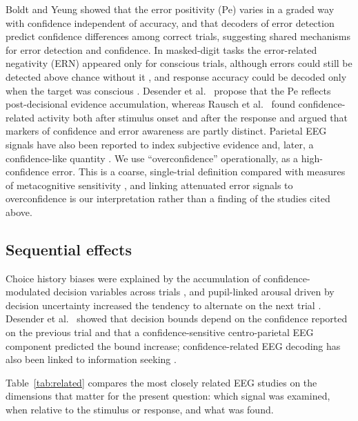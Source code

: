 \documentclass[11pt,a4paper]{article}
\begin{document}
Boldt and Yeung \cite{r3} showed that the error positivity (Pe) varies in a graded way with confidence independent of accuracy, and that decoders of error detection predict confidence differences among correct trials, suggesting shared mechanisms for error detection and confidence. In masked-digit tasks the error-related negativity (ERN) appeared only for conscious trials, although errors could still be detected above chance without it \cite{r16}, and response accuracy could be decoded only when the target was conscious \cite{r17}. Desender et al.\ \cite{r4} propose that the Pe reflects post-decisional evidence accumulation, whereas Rausch et al.\ \cite{r18} found confidence-related activity both after stimulus onset and after the response and argued that markers of confidence and error awareness are partly distinct. Parietal EEG signals have also been reported to index subjective evidence and, later, a confidence-like quantity \cite{r8}. We use ``overconfidence'' operationally, as a high-confidence error. This is a coarse, single-trial definition compared with measures of metacognitive sensitivity \cite{r19}, and linking attenuated error signals to overconfidence is our interpretation rather than a finding of the studies cited above.

\subsection{Sequential effects}

Choice history biases were explained by the accumulation of confidence-modulated decision variables across trials \cite{r20}, and pupil-linked arousal driven by decision uncertainty increased the tendency to alternate on the next trial \cite{r21}. Desender et al.\ \cite{r22} showed that decision bounds depend on the confidence reported on the previous trial and that a confidence-sensitive centro-parietal EEG component predicted the bound increase; confidence-related EEG decoding has also been linked to information seeking \cite{r5}.

Table~\ref{tab:related} compares the most closely related EEG studies on the dimensions that matter for the present question: which signal was examined, when relative to the stimulus or response, and what was found.
\end{document}

